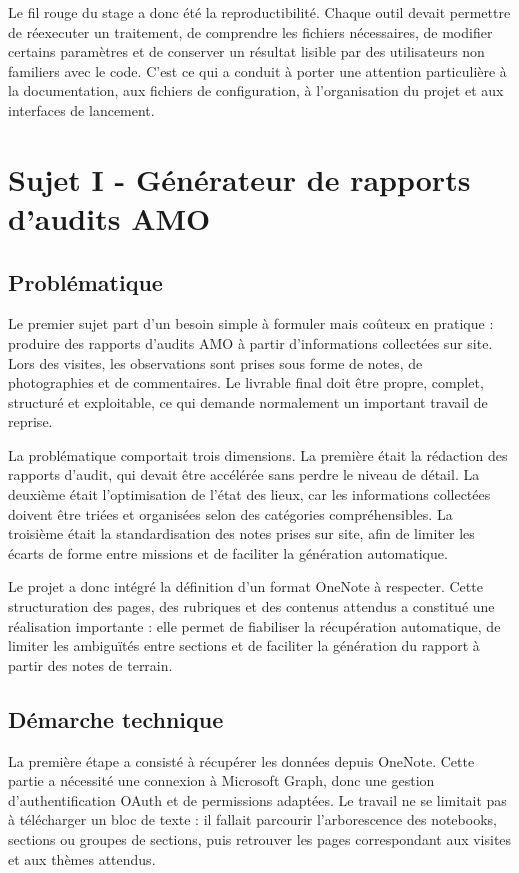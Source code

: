 \documentclass[12pt]{article}
\begin{document}
Le fil rouge du stage a donc été la reproductibilité. Chaque outil devait permettre de réexecuter un traitement, de comprendre les fichiers nécessaires, de modifier certains paramètres et de conserver un résultat lisible par des utilisateurs non familiers avec le code. C’est ce qui a conduit à porter une attention particulière à la documentation, aux fichiers de configuration, à l’organisation du projet et aux interfaces de lancement. 

\newpage
\section{Sujet I - Générateur de rapports d’audits AMO}

\subsection{Problématique}

Le premier sujet part d’un besoin simple à formuler mais coûteux en pratique : produire des rapports d’audits AMO à partir d’informations collectées sur site. Lors des visites, les observations sont prises sous forme de notes, de photographies et de commentaires. Le livrable final doit être propre, complet, structuré et exploitable, ce qui demande normalement un important travail de reprise. 

La problématique comportait trois dimensions. La première était la rédaction des rapports d’audit, qui devait être accélérée sans perdre le niveau de détail. La deuxième était l’optimisation de l’état des lieux, car les informations collectées doivent être triées et organisées selon des catégories compréhensibles. La troisième était la standardisation des notes prises sur site, afin de limiter les écarts de forme entre missions et de faciliter la génération automatique. 

Le projet a donc intégré la définition d’un format OneNote à respecter. Cette structuration des pages, des rubriques et des contenus attendus a constitué une réalisation importante : elle permet de fiabiliser la récupération automatique, de limiter les ambiguïtés entre sections et de faciliter la génération du rapport à partir des notes de terrain. 

\subsection{Démarche technique}

La première étape a consisté à récupérer les données depuis OneNote. Cette partie a nécessité une connexion à Microsoft Graph, donc une gestion d’authentification OAuth et de permissions adaptées. Le travail ne se limitait pas à télécharger un bloc de texte : il fallait parcourir l’arborescence des notebooks, sections ou groupes de sections, puis retrouver les pages correspondant aux visites et aux thèmes attendus. 
\end{document}
